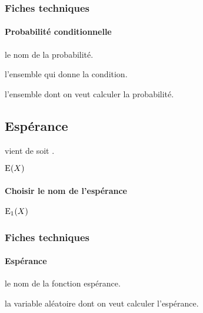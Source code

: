 \documentclass[12pt,a4paper]{article}
\begin{document}


\subsubsection{Fiches techniques}

\paragraph{Probabilité conditionnelle}





\IDoption{} le nom de la probabilité.

 l'ensemble qui donne la condition.

 l'ensemble dont on veut calculer la probabilité.




\subsection{Espérance}

\newparaexample*{}

 vient de   soit .
\begin{latexex}
$\expval{X}$
\end{latexex}




\paragraph{Choisir le nom de l'espérance}

\begin{latexex}
$\expval[E_1]{X}$
\end{latexex}




\subsubsection{Fiches techniques}

\paragraph{Espérance}


\IDoption{} le nom de la fonction espérance.

\IDarg{} la variable aléatoire dont on veut calculer l'espérance.
\end{document}

